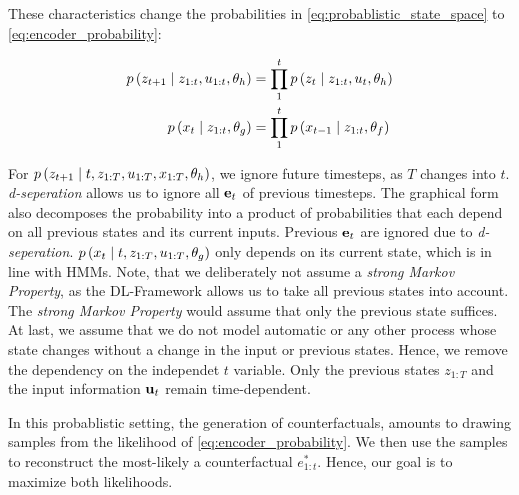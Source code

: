 \documentclass[./../../paper.tex]{subfiles}
\begin{document}


These characteristics change the probabilities in \autoref{eq:probablistic_state_space} to \autoref{eq:encoder_probability}:

\begin{align}
    \label{eq:encoder_probability}
    p\left(z_{t+1} \mid z_{1:t}, u_{1:t}, \theta_h\right)                   & =  \prod_{1}^{t} p\left(z_t \mid z_{1:t}, u_{t}, \theta_h\right) \\
    p\left(x_t \mid z_{1:t}, \theta_g\right)                   & = \prod_{1}^{t} p\left(x_{t-1} \mid z_{1:t},\theta_f\right)
\end{align}

For $p\left(z_{t+1} \mid t, z_{1:T}, u_{1:T}, x_{1:T}, \theta_h\right)$, we ignore future timesteps, as $T$ changes into $t$. \emph{d-seperation} allows us to ignore all $\mathbf{e}_t$ of previous timesteps. The graphical form also decomposes the probability into a product of probabilities that each depend on all previous states and its current inputs. Previous $\mathbf{e}_t$ are ignored due to \emph{d-seperation}. $p\left(x_t \mid t, z_{1:T}, u_{1:T}, \theta_g\right)$ only depends on its current state, which is in line with \glspl{HMM}.
Note, that we deliberately not assume a \emph{strong Markov Property}, as the \gls{DL}-Framework allows us to take all previous states into account. The \emph{strong Markov Property} would assume that only the previous state suffices. At last, we assume that we do not model automatic or any other process whose state changes without a change in the input or previous states. Hence, we remove the dependency on the independet $t$ variable. Only the previous states $z_{1:T}$ and the input information $\mathbf{u}_t$ remain time-dependent. 

In this probablistic setting, the generation of counterfactuals, amounts to drawing samples from the likelihood of \autoref{eq:encoder_probability}. We then use the samples to reconstruct the most-likely a counterfactual $e_{1:t}^*$. Hence, our goal is to maximize both likelihoods. 

\end{document}
